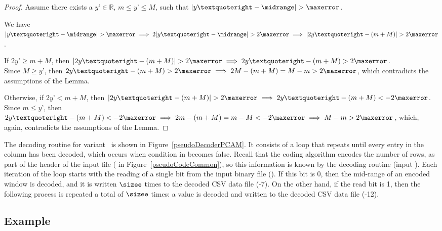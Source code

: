 \newcommand{\yOne}{y’}
\begin{proof}
Assume there exists a $\yOne \in \mathbb{R}$, $m\leq \yOne\leq M$, such that $|\yOne-\midrange|> \maxerror$.

We have $|\yOne-\midrange|> \maxerror \implies 2|\yOne-\midrange|> 2\maxerror \implies |2\yOne-(m+M)|> 2\maxerror$.

If $2\yOne\geq m+M$, then $|2\yOne-(m+M)|> 2\maxerror \implies 2\yOne-(m+M)> 2\maxerror$.\\
Since $M\geq \yOne$, then $2\yOne-(m+M)> 2\maxerror \implies 2M-(m+M) = M-m > 2\maxerror$, which contradicts the assumptions of the Lemma.

Otherwise, if $2\yOne< m+M$, then $|2\yOne-(m+M)|> 2\maxerror \implies 2\yOne-(m+M)< -2\maxerror$.\\
Since $m \leq \yOne$, then $2\yOne-(m+M)< -2\maxerror \implies 2m-(m+M)=m-M < -2\maxerror \implies M-m > 2\maxerror$, which, again, contradicts the assumptions of the Lemma.
\end{proof}


The decoding routine for variant \maskalgo\ is shown in Figure~\ref{pseudoDecoderPCAM}. It consists of a loop that repeats until every entry in the column has been decoded, which occurs when condition in  becomes false. Recall that the coding algorithm encodes the number of rows, as part of the header of the input file ( in Figure~\ref{pseudoCodeCommon}), so this information is known by the decoding routine (input \colSize). Each iteration of the loop starts with the reading of a single bit from the input binary file (). If this bit is 0, then the mid-range of an encoded window is decoded, and it is written $\sizee$ times to the decoded CSV data file (-7). On the other hand, if the read bit is 1, then the following process is repeated a total of $\sizee$ times: a value is decoded and written to the decoded CSV data file (-12).





\clearpage




\subsection{Example}
\label{algo:pca:example}
\newcommand{\exampleRecallIrrelevant}[1]{Recall that the specific timestamp values are irrelevant for algorithm #1}


